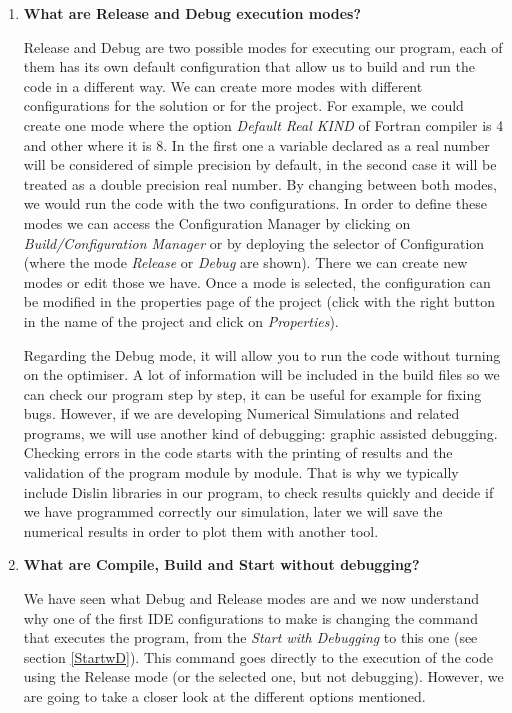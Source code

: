 \begin{enumerate}
    
    \item \textbf{What are Release and Debug execution modes?} 
    
    Release and Debug are two possible modes for executing our program, each of them has its own default configuration that allow us to build and run the code in a different way. We can create more modes with different configurations for the solution or for the project. For example, we could create one mode where the option \textit{Default Real KIND} of Fortran compiler is 4 and other where it is 8. In the first one a variable declared as a real number will be considered of simple precision by default, in the second case it will be treated as a double precision real number. By changing between both modes, we would run the code with the two configurations. In order to define these modes we can access the Configuration Manager by clicking on \textit{Build/Configuration Manager} or by deploying the selector of Configuration (where the mode \textit{Release} or \textit{Debug} are shown). There we can create new modes or edit those we have. Once a mode is selected, the configuration can be modified in the properties page of the project (click with the right button in the name of the project and click on \textit{Properties}). 
   
    Regarding the Debug mode, it will allow you to run the code without turning on the optimiser. A lot of information will be included in the build files so we can check our program step by step, it can be useful for example for fixing bugs. However, if we are developing Numerical Simulations and related programs, we will use another kind of debugging: graphic assisted debugging. Checking errors in the code starts with the printing of results and the validation of the program module by module. That is why we typically include Dislin libraries in our program, to check results quickly and decide if we have programmed correctly our simulation, later we will save the numerical results in order to plot them with another tool. 
    
    \item \textbf{What are Compile, Build and Start without debugging?}
    
    We have seen what Debug and Release modes are and we now understand why one of the first IDE configurations to make is changing the command that executes the program, from the \textit{Start with Debugging} to this one (see section \ref{StartwD}). This command goes directly to the execution of the code using the Release mode (or the selected one, but not debugging). However, we are going to take a closer look at the different options mentioned.
    

\end{enumerate}
